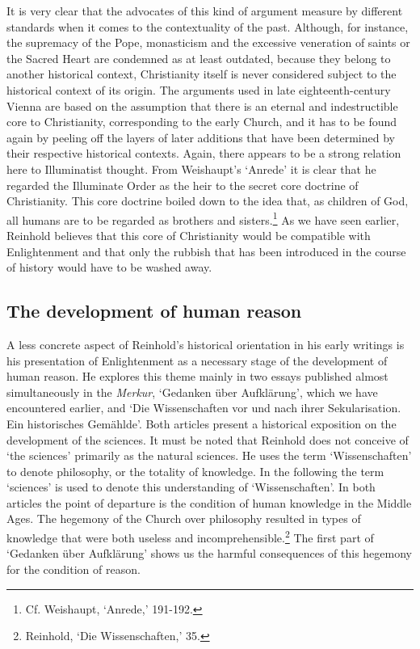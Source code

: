 It is very clear that the advocates of this kind of argument measure by different standards when it comes to the contextuality of the past. Although, for instance, the supremacy of the Pope, monasticism and the excessive veneration of saints or the Sacred Heart are condemned as at least outdated, because they belong to another historical context, Christianity itself is never considered subject to the historical context of its origin. The arguments used in late eighteenth{-}century Vienna are based on the assumption that there is an eternal and indestructible core to Christianity, corresponding to the early Church, and it has to be found again by peeling off the layers of later additions that have been determined by their respective historical contexts. Again, there appears to be a strong relation here to Illuminatist thought. From Weishaupt's `Anrede' it is clear that he regarded the Illuminate Order as the heir to the secret core doctrine of Christianity. This core doctrine boiled down to the idea that, as children of God, all humans are to be regarded as brothers and sisters.\footnote{ Cf. Weishaupt, `Anrede,' 191{-}192.} As we have seen earlier, Reinhold believes that this core of Christianity would be compatible with Enlightenment and that only the rubbish that has been introduced in the course of history would have to be washed away.


\subsection{The development of human reason}


A less concrete aspect of Reinhold's historical orientation in his early writings is his presentation of Enlightenment as a necessary stage of the development of human reason. He explores this theme mainly in two essays published almost simultaneously in the \textit{Merkur}, `Gedanken \"{u}ber Aufkl\"{a}rung', which we have encountered earlier, and `Die Wissenschaften vor und nach ihrer Sekularisation. Ein historisches Gem\"{a}hlde'. Both articles present a historical exposition on the development of the sciences. It must be noted that Reinhold does not conceive of `the sciences' primarily as the natural sciences. He uses the term `Wissenschaften' to denote philosophy, or the totality of knowledge. In the following the term `sciences' is used to denote this understanding of `Wissenschaften'. In both articles the point of departure is the condition of human knowledge in the Middle Ages. The hegemony of the Church over philosophy resulted in types of knowledge that were both useless and incomprehensible.\footnote{ Reinhold, `Die Wissenschaften,' 35.} The first part of `Gedanken \"{u}ber Aufkl\"{a}rung' shows us the harmful consequences of this hegemony for the condition of reason.

